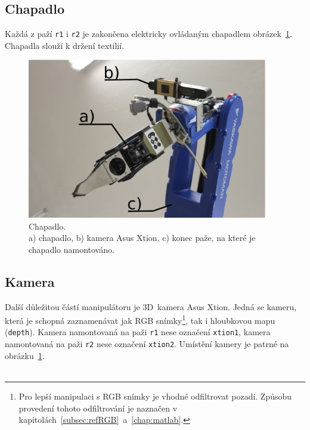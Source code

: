 \documentclass[10pt,a4paper,titlepage,oneside]{report}
\begin{document}
\subsection{Chapadlo}
\label{subsec:gripper}
Každá z paží \verb|r1| i \verb|r2| je zakončena elektricky ovládaným chapadlem obrázek~\ref{fig:gripper}. Chapadla slouží k držení textilií.

\begin{figure}[H]
	\centering  	
  	\includegraphics[height=7cm]{pictures/gripperXtion.eps}
  	\caption[]{Chapadlo.\\a) chapadlo, b) kamera Asus Xtion, c) konec paže, na které je chapadlo namontováno.	  	
  	}
  	\label{fig:gripper}
\end{figure}

\subsection{Kamera}
\label{subsec:camera}
Další důležitou částí manipulátoru je 3D~kamera Asus Xtion. Jedná se kameru, která je schopná zaznamenávat jak RGB snímky\footnote{Pro lepší manipulaci s RGB snímky je vhodné odfiltrovat pozadí. Způsobu provedení tohoto odfiltrování je naznačen v kapitolách~\ref{subsec:refRGB}~a~\ref{chap:matlab}.}, tak i hloubkovou mapu (\verb|depth|). Kamera namontovaná na paži \verb|r1| nese označení \verb|xtion1|, kamera namontovaná na paži \verb|r2| nese označení \verb|xtion2|. Umístění kamery je patrné na obrázku~\ref{fig:gripper}.\\
\\


\end{document}
